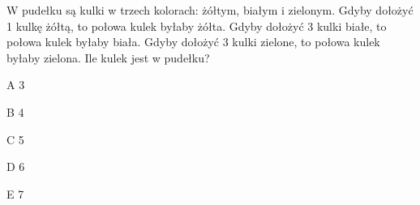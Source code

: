 \begin{tresc}
W pudełku są kulki w trzech kolorach: żółtym, białym i zielonym. Gdyby dołożyć 1 kulkę żółtą, to połowa kulek byłaby żółta. Gdyby dołożyć 3 kulki białe, to połowa kulek byłaby biała. Gdyby dołożyć 3 kulki zielone, to połowa kulek byłaby zielona. Ile kulek jest w pudełku?
\end{tresc}
\begin{wariant}{A} 3 \end{wariant}
\begin{wariant}{B} 4 \end{wariant}
\begin{wariant}{C} 5 \end{wariant}
\begin{wariant}{D} 6 \end{wariant}
\begin{wariant}{E} 7 \end{wariant}
